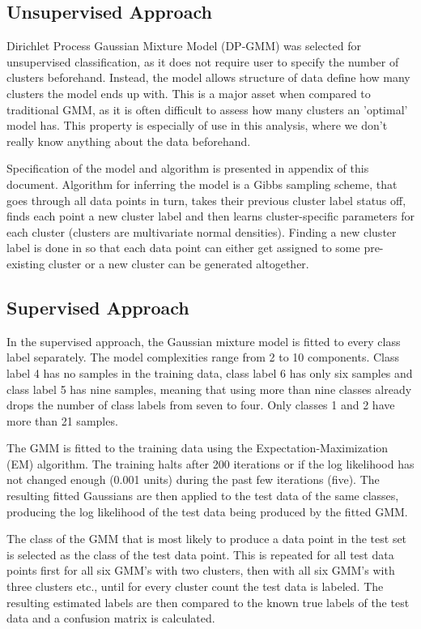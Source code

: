 \documentclass[a4paper]{article}
\begin{document}
\subsection{Unsupervised Approach}

Dirichlet Process Gaussian Mixture Model (DP-GMM) was selected for unsupervised classification, as it does not require user to specify the number of clusters beforehand. Instead, the model allows structure of data define how many clusters the model ends up with. This is a major asset when compared to traditional GMM,  as it is often difficult to assess how many clusters an 'optimal' model has. This property is especially of use in this analysis, where we don't really know anything about the data beforehand. 

Specification of the model and algorithm is presented in appendix of this document. Algorithm for inferring the model is a Gibbs sampling scheme, that goes through all data points in turn, takes their previous cluster label status off, finds each point a new cluster label and then learns cluster-specific parameters for each cluster (clusters are multivariate normal densities). Finding a new cluster label is done in so that each data point can either get assigned to some pre-existing cluster or a new cluster can be generated altogether.

  
\subsection{Supervised Approach}

In the supervised approach, the Gaussian mixture model is fitted to every
class label separately. The model complexities range from 2 to 10 components.
Class label 4 has no samples in the training data, class label 6 has only six
samples and class label 5 has nine samples, meaning that using more than nine
classes already drops the number of class labels from seven to four. Only
classes 1 and 2 have more than 21 samples.

\par
The GMM is fitted to the training data using the Expectation-Maximization (EM)
algorithm. The training halts after 200 iterations or if the log likelihood
has not changed enough (0.001 units) during the past few iterations (five).
The resulting fitted Gaussians are then applied to the test data of the same
classes, producing the log likelihood of the test data being produced by the
fitted GMM.

\par
The class of the GMM that is most likely to produce a data point in the test
set is selected as the class of the test data point. This is repeated for all
test data points first for all six GMM's with two clusters, then with all six
GMM's with three clusters etc., until for every cluster count the test data is
labeled. The resulting estimated labels are then compared to the known true
labels of the test data and a confusion matrix is calculated.
\end{document}
